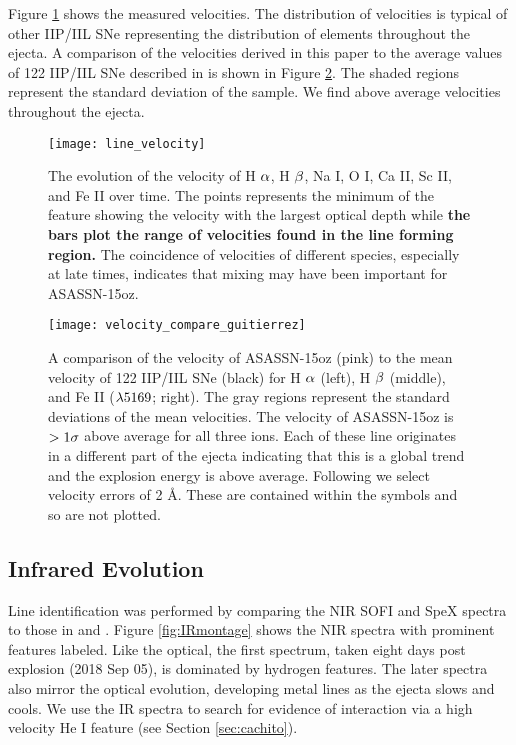 \documentclass[a4paper,fleqn,usenatbib]{mnras}
\begin{document}
Figure \ref{fig:velocity} shows the measured velocities. 
The distribution of velocities is typical of other IIP/IIL SNe representing the distribution of elements throughout the ejecta. 
A comparison of the velocities derived in this paper to the average values of 122 IIP/IIL SNe described in \citet{2017gutierrez} is shown in Figure \ref{fig:VelocityCompare}. 
The shaded regions represent the standard deviation of the sample.
We find above average velocities throughout the ejecta.
\begin{figure}
\begin{center}
\texttt{[image: line\_velocity]}
\caption{The evolution of the velocity of H $\rm{\alpha}$, H $\rm{\beta}$, Na I, O I, Ca II, Sc II, and Fe II over time. 
The points represents the minimum of the feature showing the velocity with the largest optical depth while \textbf{the bars plot the range of velocities found in the line forming region.}
The coincidence of velocities of different species, especially at late times, indicates that mixing may have been important for ASASSN-15oz.}
\label{fig:velocity}
\end{center}
\end{figure}
\begin{figure*}
\begin{center}
\texttt{[image: velocity\_compare\_guitierrez]}
\caption{A comparison of the velocity of ASASSN-15oz (pink) to the mean velocity of 122 IIP/IIL SNe \citep{2017gutierrez} (black) for H $\rm{\alpha}$ (left), H $\rm{\beta}$ (middle), and Fe II ($\rm{\lambda 5169}$; right). 
The gray regions represent the standard deviations of the mean velocities.
The velocity of ASASSN-15oz is $\rm{>1\sigma}$ above average for all three ions. 
Each of these line originates in a different part of the ejecta indicating that this is a global trend and the explosion energy is above average. 
Following \citep{2012silverman} we select velocity errors of 2 \AA.
These are contained within the symbols and so are not plotted.}
\label{fig:VelocityCompare}
\end{center}
\end{figure*}
\subsection{Infrared Evolution}
Line identification was performed by comparing the NIR SOFI and SpeX spectra to those in \citet{2015valenti} and \citet{2018tomasella}.
Figure \ref{fig:IRmontage} shows the NIR spectra with prominent features labeled.
Like the optical, the first spectrum, taken eight days post explosion (2018 Sep 05), is dominated by hydrogen features.
The later spectra also mirror the optical evolution, developing metal lines as the ejecta slows and cools.
We use the IR spectra to search for evidence of interaction via a high velocity He I feature (see Section \ref{sec:cachito}).
\end{document}
